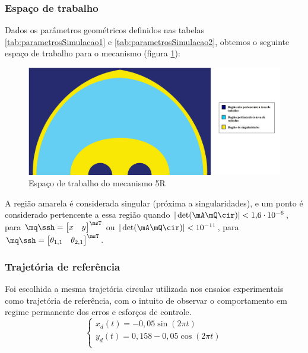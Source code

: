 \documentclass[]{politex}
\begin{document}
\subsubsection{Espaço de trabalho}

Dados os parâmetros geométricos definidos nas tabelas \ref{tab:parametrosSimulacao1} e \ref{tab:parametrosSimulacao2}, obtemos o seguinte espaço de trabalho para o mecanismo (figura \ref{fig:RRWS}):

\begin{figure}[h]
	\centering
	\includegraphics[scale=0.35]{../figures/Workspace.png}  
	\caption{Espaço de trabalho do mecanismo 5R}
	\label{fig:RRWS}
\end{figure}

A região amarela é considerada singular (próxima a singularidades), e um ponto é considerado pertencente a essa região quando $|\det(\mA\mQ\cir)| < 1{,}6 \cdot 10^{-6}$, para $\mq\ssh = \begin{bmatrix} x & y \end{bmatrix}^\msT$ ou $|\det(\mA\mQ\cir)| < 10^{-11}$, para $\mq\ssh = \begin{bmatrix} \theta_{1,1} & \theta_{2,1} \end{bmatrix}^\msT$.

\subsubsection{Trajetória de referência}
Foi escolhida a mesma trajetória circular utilizada nos ensaios experimentais como trajetória de referência, com o intuito de observar o comportamento em regime permanente dos erros e esforços de controle.
\begin{equation}
\begin{cases}
x_{d}(t) = -0{,}05 \sin(2 \pi t) \\
y_{d}(t) = 0{,}158 - 0{,}05 \cos(2 \pi t) \\
\end{cases}
\end{equation}
\end{document}
